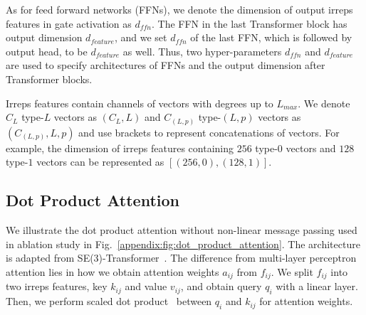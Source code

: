 As for feed forward networks (FFNs), we denote the dimension of output irreps features in gate activation as $d_{ffn}$.
The FFN in the last Transformer block has output dimension $d_{feature}$, and we set $d_{ffn}$ of the last FFN, which is followed by output head, to be $d_{feature}$ as well.
Thus, two hyper-parameters $d_{ffn}$ and $d_{feature}$ are used to specify architectures of FFNs and the output dimension after Transformer blocks.

Irreps features contain channels of vectors with degrees up to $L_{max}$.
We denote $C_L$ type-$L$ vectors as $(C_L, L)$ and $C_{(L, p)}$ type-$(L, p)$ vectors as $(C_{(L, p)}, L, p)$ and use brackets to represent concatenations of vectors.
For example, the dimension of irreps features containing $256$ type-$0$ vectors and $128$ type-$1$ vectors can be represented as $[(256, 0), (128, 1)]$.







\subsection{Dot Product Attention}
\label{appendix:subsec:dot_product_attention}
We illustrate the dot product attention without non-linear message passing used in ablation study in Fig.~\ref{appendix:fig:dot_product_attention}.
The architecture is adapted from SE(3)-Transformer~\citep{se3_transformer}.
The difference from multi-layer perceptron attention lies in how we obtain attention weights $a_{ij}$ from $f_{ij}$.
We split $f_{ij}$ into two irreps features, key $k_{ij}$ and value $v_{ij}$, and obtain query $q_{i}$ with a linear layer.
Then, we perform scaled dot product~\citep{transformer} between $q_i$ and $k_{ij}$ for attention weights.



